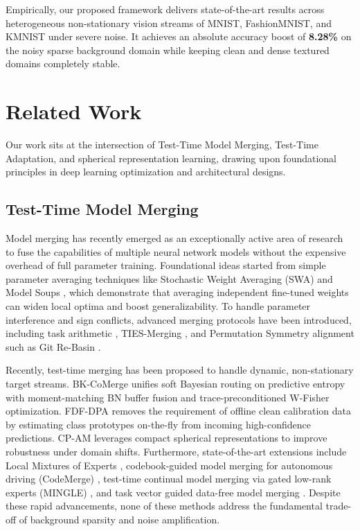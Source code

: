 \documentclass{article}
\theoremstyle{plain}
\theoremstyle{definition}
\theoremstyle{remark}
\begin{document}
Empirically, our proposed framework delivers state-of-the-art results across heterogeneous non-stationary vision streams of MNIST, FashionMNIST, and KMNIST under severe noise. It achieves an absolute accuracy boost of \textbf{8.28\%} on the noisy sparse background domain while keeping clean and dense textured domains completely stable.

\section{Related Work}
\label{related}
Our work sits at the intersection of Test-Time Model Merging, Test-Time Adaptation, and spherical representation learning, drawing upon foundational principles in deep learning optimization and architectural designs.

\subsection{Test-Time Model Merging}
Model merging has recently emerged as an exceptionally active area of research to fuse the capabilities of multiple neural network models without the expensive overhead of full parameter training. Foundational ideas started from simple parameter averaging techniques like Stochastic Weight Averaging (SWA) \cite{izmailov2018averaging} and Model Soups \cite{wortsman2022soups, wortsman2022robust}, which demonstrate that averaging independent fine-tuned weights can widen local optima and boost generalizability. To handle parameter interference and sign conflicts, advanced merging protocols have been introduced, including task arithmetic \cite{ilharco2022editing, ilharco2023editing}, TIES-Merging \cite{yadav2023ties}, and Permutation Symmetry alignment such as Git Re-Basin \cite{ainsworth2023git}.

Recently, test-time merging has been proposed to handle dynamic, non-stationary target streams. BK-CoMerge \cite{bkcomerge2026} unifies soft Bayesian routing on predictive entropy with moment-matching BN buffer fusion and trace-preconditioned W-Fisher optimization. FDF-DPA \cite{fdfdpa2026} removes the requirement of offline clean calibration data by estimating class prototypes on-the-fly from incoming high-confidence predictions. CP-AM \cite{cpam2026} leverages compact spherical representations to improve robustness under domain shifts. Furthermore, state-of-the-art extensions include Local Mixtures of Experts \cite{bertolissi2025local}, codebook-guided model merging for autonomous driving (CodeMerge) \cite{yang2025codemerge}, test-time continual model merging via gated low-rank experts (MINGLE) \cite{qiu2025mingle}, and task vector guided data-free model merging \cite{cheng2025wudi}. Despite these rapid advancements, none of these methods address the fundamental trade-off of background sparsity and noise amplification.
\end{document}
